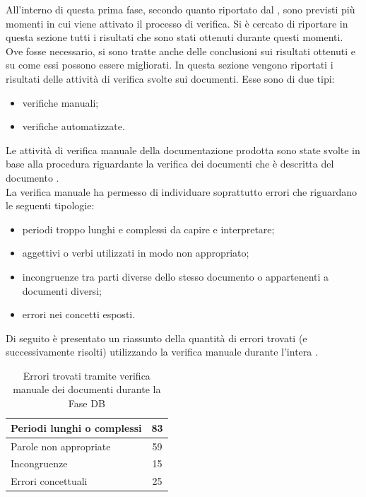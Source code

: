  \label{app:esitiDB}
	All'interno di questa prima fase, secondo quanto riportato dal , sono previsti più momenti in cui viene attivato il 
	processo di verifica. Si è cercato di riportare in questa sezione tutti i risultati che sono stati ottenuti durante questi momenti. Ove fosse 
	necessario, si sono tratte anche delle conclusioni sui risultati ottenuti e su come essi possono essere migliorati.
			In questa sezione vengono riportati i risultati delle attività di verifica svolte sui documenti. Esse sono di due tipi:
			\begin{itemize}
				\item verifiche manuali;
				\item verifiche automatizzate.
			\end{itemize}
				Le attività di verifica manuale della documentazione prodotta sono state svolte in base alla procedura riguardante la verifica dei 
				documenti che è descritta del documento .\\
				La verifica manuale ha permesso di individuare soprattutto errori che riguardano le seguenti tipologie:
				\begin{itemize}
					\item periodi troppo lunghi e complessi da capire e interpretare;
					\item aggettivi o verbi utilizzati in modo non appropriato;
					\item incongruenze tra parti diverse dello stesso documento o appartenenti a documenti diversi;
					\item errori nei concetti esposti.
				\end{itemize}
				Di seguito è presentato un riassunto della quantità di errori trovati (e successivamente risolti) utilizzando la verifica manuale durante 
				l'intera .
				\begin{table}[H]
					\centering
					\begin{tabu}{| l | c |}
						\hline
						Periodi lunghi o complessi	&83	\\ \hline
						Parole non appropriate	&59	\\ \hline
						Incongruenze	&15	\\ \hline
						Errori concettuali	&25	\\ \hline
					\end{tabu}
					\caption{Errori trovati tramite verifica manuale dei documenti durante la Fase DB}
				\end{table}
